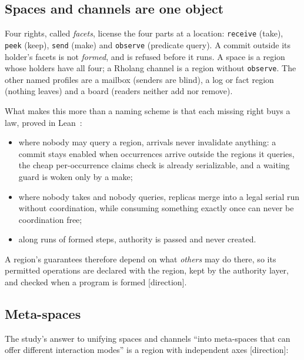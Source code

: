 \documentclass[11pt]{article}
\newcommand{\code}[1]{\texttt{#1}}
\newcommand{\kind}[1]{\textsf{\small[#1]}}
\begin{document}
\subsection{Spaces and channels are one object}

Four rights, called \emph{facets}, license the four parts at a location:
\code{receive} (take), \code{peek} (keep), \code{send} (make) and
\code{observe} (predicate query).  A commit outside its holder's facets is not
\emph{formed}, and is refused before it runs.  A space is a region whose
holders have all four; a Rholang channel is a region without \code{observe}.
The other named profiles are a mailbox (senders are blind), a log or fact
region (nothing leaves) and a board (readers neither add nor remove).

What makes this more than a naming scheme is that each missing right buys a
law, proved in Lean~\cite{interaction-basis}:

\begin{itemize}
\item where nobody may query a region, arrivals never invalidate anything: a
  commit stays enabled when occurrences arrive outside the regions it queries,
  the cheap per-occurrence claims check is already serializable, and a
  waiting guard is woken only by a make;
\item where nobody takes and nobody queries, replicas merge into a legal
  serial run without coordination, while consuming something exactly once can
  never be coordination free;
\item along runs of formed steps, authority is passed and never created.
\end{itemize}

\noindent
A region's guarantees therefore depend on what \emph{others} may do there, so
its permitted operations are declared with the region, kept by the authority
layer, and checked when a program is formed \kind{direction}.

\subsection{Meta-spaces}

The study's answer to unifying spaces and channels ``into meta-spaces that can
offer different interaction modes'' is a region with independent axes
\kind{direction}:
\end{document}
